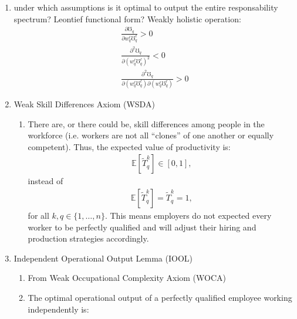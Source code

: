 \documentclass[hidelinks, nonatbib]{elsarticle}
\begin{document}
\begin{enumerate}
    \item under which assumptions is it optimal to output the entire responsability spectrum? Leontief functional form? Weakly holistic operation:
    \begin{gather}
        \frac{
            \partial
            \mho_q
        }{
            \partial
            w_{q}^{\ell}
            \mho_{q}^{\ell}
        }
        > 0
        \\
        \frac{
            \partial ^ 2
            \mho_q
        }{
            \partial
            \left(
                w_{q}^{\ell}
                \mho_{q}^{\ell}
            \right) ^ 2
        }
        < 0
        \\
        \frac{
            \partial ^ 2
            \mho_q
        }{
            \partial
            \left(
                w_{q}^{\ell}
                \mho_{q}^{\ell}
            \right)
            \partial
            \left(
                w_{q}^{r}
                \mho_{q}^{r}
            \right)
        }
        > 0
    \end{gather}
    \item Weak Skill Differences Axiom (WSDA)
    \begin{enumerate}
        \item There are, or there could be, skill differences among people in the workforce (i.e. workers are not all ``clones'' of one another or equally competent). Thus, the expected value of productivity is:
        \begin{gather}
            \mathbb{E}[
                \tilde{T}_{q}^{k}
            ]
            \in
            [0,1]
            ,
        \end{gather}
        instead of 
        \begin{gather}
            \mathbb{E}[
                \tilde{T}_{q}^{k}
            ]
            =
            \tilde{T}_{q}^{k}
            = 1
            ,
        \end{gather}
        for all $k,q \in \{1, \dots, n\}$. This means employers do not expected every worker to be perfectly qualified and will adjust their hiring and production strategies accordingly.
    \end{enumerate}
    \item Independent Operational Output Lemma (IOOL)
    \begin{enumerate}
        \item From Weak Occupational Complexity Axiom (WOCA)
        \item The optimal operational output of a perfectly qualified employee working independently is:

\end{enumerate}
\end{enumerate}
\end{document}
